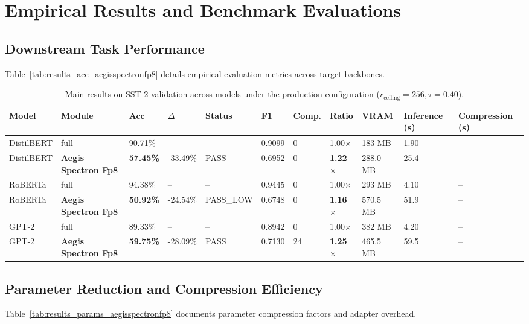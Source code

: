 \section{Empirical Results and Benchmark Evaluations}

\subsection{Downstream Task Performance}
Table~\ref{tab:results_acc_aegisspectronfp8} details empirical evaluation metrics across target backbones.

\begin{table}[t]
\centering
\small
\begin{tabular}{lllllllllll}
\toprule
\textbf{Model} & \textbf{Module} & \textbf{Acc} & \textbf{$\Delta$} & \textbf{Status} & \textbf{F1} & \textbf{Comp.} & \textbf{Ratio} & \textbf{VRAM} & \textbf{Inference (s)} & \textbf{Compression (s)} \\
\midrule
DistilBERT & full & 90.71\% & -- & -- & 0.9099 & 0 & 1.00$\times$ & 183 MB & 1.90 & -- \\
DistilBERT & \textbf{Aegis Spectron Fp8} & \textbf{57.45\%} & -33.49\% & PASS & 0.6952 & 0 & \textbf{1.22$\times$} & 288.0 MB & 25.4 & -- \\
RoBERTa & full & 94.38\% & -- & -- & 0.9445 & 0 & 1.00$\times$ & 293 MB & 4.10 & -- \\
RoBERTa & \textbf{Aegis Spectron Fp8} & \textbf{50.92\%} & -24.54\% & PASS_LOW & 0.6748 & 0 & \textbf{1.16$\times$} & 570.5 MB & 51.9 & -- \\
GPT-2 & full & 89.33\% & -- & -- & 0.8942 & 0 & 1.00$\times$ & 382 MB & 4.20 & -- \\
GPT-2 & \textbf{Aegis Spectron Fp8} & \textbf{59.75\%} & -28.09\% & PASS & 0.7130 & 24 & \textbf{1.25$\times$} & 465.5 MB & 59.5 & -- \\
\bottomrule
\end{tabular}
\caption{Main results on SST-2 validation across models under the production configuration ($r_{\mathrm{ceiling}}=256, \tau=0.40$).}
\label{tab:main_sst2}
\end{table}

\subsection{Parameter Reduction and Compression Efficiency}
Table~\ref{tab:results_params_aegisspectronfp8} documents parameter compression factors and adapter overhead.

